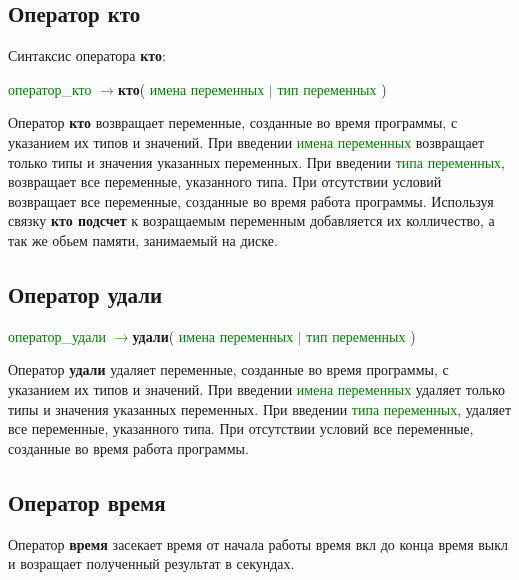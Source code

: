 \documentclass[10pt]{report}
\begin{document}
 \subsection{Оператор кто}
    Синтаксис оператора \textbf{\glqq  кто\grqq }:
  \begin{center}
    \textcolor{Green}{оператор_кто $\rightarrow$}\textbf{кто}( \textcolor{Green}{имена переменных $\vert $ тип переменных} )
 \end{center}
    Оператор  \textbf{\glqq  кто\grqq }  возвращает переменные, созданные во время программы, с указанием их типов и значений. При введении \textcolor{Green}{имена переменных} возвращает только типы и значения указанных переменных. При введении \textcolor{Green}{типа переменных}, возвращает все переменные, указанного типа. При отсутствии условий возвращает все переменные, созданные во время работа программы. Используя связку \textbf{\glqq кто подсчет \grqq } к возращаемым переменным добавляется их колличество, а так же обьем памяти, занимаемый на диске.
    \subsection{Оператор удали}
      \begin{center}
    \textcolor{Green}{оператор_удали $\rightarrow$}\textbf{удали}( \textcolor{Green}{имена переменных $\vert $ тип переменных} )
 \end{center}
 Оператор  \textbf{\glqq  удали\grqq }  удаляет переменные, созданные во время программы, с указанием их типов и значений. При введении \textcolor{Green}{имена переменных} удаляет только типы и значения указанных переменных. При введении \textcolor{Green}{типа переменных}, удаляет все переменные, указанного типа. При отсутствии условий все переменные, созданные во время работа программы. 
   \subsection{Оператор время}
      \begin{center}
 \end{center}
 Оператор  \textbf{\glqq  время\grqq } засекает время от начала работы {\glqq время вкл\glqq } до конца {\glqq время выкл\glqq } и возращает полученный результат в секундах.
 
\end{document}
